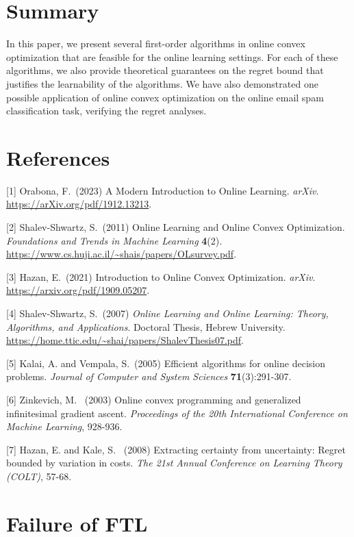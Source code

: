 \documentclass{article}
\begin{document}
\section{Summary}
In this paper, we present several first-order algorithms in online convex optimization that are feasible for the online learning settings. For each of these algorithms, we also provide theoretical guarantees on the regret bound that justifies the learnability of the algorithms. We have also demonstrated one possible application of online convex optimization on the online email spam classification task,  verifying the regret analyses.

\newpage
\section*{References}
{
\small


[1] Orabona, F.\ (2023) A Modern Introduction to Online Learning.
  {\it arXiv}. \url{https://arXiv.org/pdf/1912.13213}.

[2] Shalev-Shwartz, S.\ (2011) Online Learning and Online Convex Optimization.
  {\it Foundations and Trends in Machine Learning} {\bf 4}(2). \url{https://www.cs.huji.ac.il/~shais/papers/OLsurvey.pdf}.

[3] Hazan, E.\ (2021) Introduction to Online Convex Optimization.
  {\it arXiv}. \url{https://arxiv.org/pdf/1909.05207}.

[4] Shalev-Shwartz, S.\ (2007) {\it Online Learning and Online Learning: Theory, Algorithms, and Applications}.
Doctoral Thesis, Hebrew University. \url{https://home.ttic.edu/~shai/papers/ShalevThesis07.pdf}.

[5] Kalai, A. and Vempala, S.\ (2005) Efficient algorithms for online decision problems. {\it Journal of Computer and System Sciences} {\bf 71}(3):291-307.

[6] Zinkevich, M. \ (2003) Online convex programming and generalized infinitesimal gradient ascent. {\it Proceedings of the 20th International Conference on Machine Learning}, 928-936.

[7] Hazan, E. and Kale, S. \ (2008) Extracting certainty from uncertainty: Regret bounded by variation in costs. {\it The 21st Annual Conference on Learning Theory (COLT)}, 57-68.

}


\appendix

\section{Failure of FTL}
\end{document}
